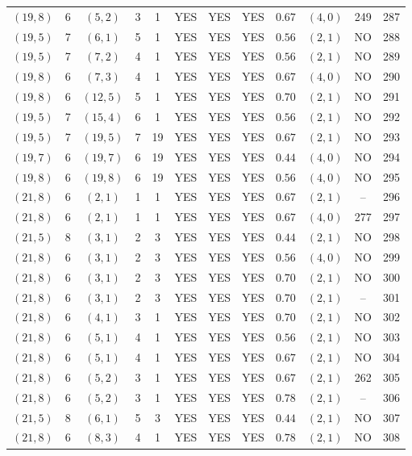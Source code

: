 \begin{longtable}{|c|c|c|c|c|c|c|c|c|c|c|c|}
$(19,8)$ & 6 & $(5,2)$ & 3 & 1 & YES & YES & YES & $0.67$ & $(4,0)$ & 249 & 287\\
$(19,5)$ & 7 & $(6,1)$ & 5 & 1 & YES & YES & YES & $0.56$ & $(2,1)$ & NO & 288\\
$(19,5)$ & 7 & $(7,2)$ & 4 & 1 & YES & YES & YES & $0.56$ & $(2,1)$ & NO & 289\\
$(19,8)$ & 6 & $(7,3)$ & 4 & 1 & YES & YES & YES & $0.67$ & $(4,0)$ & NO & 290\\
$(19,8)$ & 6 & $(12,5)$ & 5 & 1 & YES & YES & YES & $0.70$ & $(2,1)$ & NO & 291\\
$(19,5)$ & 7 & $(15,4)$ & 6 & 1 & YES & YES & YES & $0.56$ & $(2,1)$ & NO & 292\\
$(19,5)$ & 7 & $(19,5)$ & 7 & 19 & YES & YES & YES & $0.67$ & $(2,1)$ & NO & 293\\
$(19,7)$ & 6 & $(19,7)$ & 6 & 19 & YES & YES & YES & $0.44$ & $(4,0)$ & NO & 294\\
$(19,8)$ & 6 & $(19,8)$ & 6 & 19 & YES & YES & YES & $0.56$ & $(4,0)$ & NO & 295\\
$(21,8)$ & 6 & $(2,1)$ & 1 & 1 & YES & YES & YES & $0.67$ & $(2,1)$ & -- & 296\\
$(21,8)$ & 6 & $(2,1)$ & 1 & 1 & YES & YES & YES & $0.67$ & $(4,0)$ & 277 & 297\\
$(21,5)$ & 8 & $(3,1)$ & 2 & 3 & YES & YES & YES & $0.44$ & $(2,1)$ & NO & 298\\
$(21,8)$ & 6 & $(3,1)$ & 2 & 3 & YES & YES & YES & $0.56$ & $(4,0)$ & NO & 299\\
$(21,8)$ & 6 & $(3,1)$ & 2 & 3 & YES & YES & YES & $0.70$ & $(2,1)$ & NO & 300\\
$(21,8)$ & 6 & $(3,1)$ & 2 & 3 & YES & YES & YES & $0.70$ & $(2,1)$ & -- & 301\\
$(21,8)$ & 6 & $(4,1)$ & 3 & 1 & YES & YES & YES & $0.70$ & $(2,1)$ & NO & 302\\
$(21,8)$ & 6 & $(5,1)$ & 4 & 1 & YES & YES & YES & $0.56$ & $(2,1)$ & NO & 303\\
$(21,8)$ & 6 & $(5,1)$ & 4 & 1 & YES & YES & YES & $0.67$ & $(2,1)$ & NO & 304\\
$(21,8)$ & 6 & $(5,2)$ & 3 & 1 & YES & YES & YES & $0.67$ & $(2,1)$ & 262 & 305\\
$(21,8)$ & 6 & $(5,2)$ & 3 & 1 & YES & YES & YES & $0.78$ & $(2,1)$ & -- & 306\\
$(21,5)$ & 8 & $(6,1)$ & 5 & 3 & YES & YES & YES & $0.44$ & $(2,1)$ & NO & 307\\
$(21,8)$ & 6 & $(8,3)$ & 4 & 1 & YES & YES & YES & $0.78$ & $(2,1)$ & NO & 308\\

\end{longtable}
